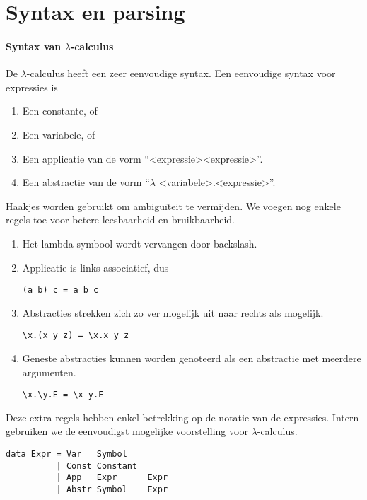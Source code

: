 \documentclass[a4paper,10pt]{article}
\begin{document}
\section{Syntax en parsing}
\paragraph {Syntax van $\lambda$-calculus}
De $\lambda$-calculus heeft een zeer eenvoudige syntax.
Een eenvoudige syntax voor expressies is
\begin{enumerate}
\item Een constante, of
\item Een variabele, of
\item Een applicatie van de vorm ``\textless expressie\textgreater \textless expressie\textgreater''.
\item Een abstractie van de vorm ``$\lambda$ \textless variabele\textgreater .\textless expressie\textgreater''.
\end{enumerate}
Haakjes worden gebruikt om ambigu{\"i}teit te vermijden.
We voegen nog enkele regels toe voor betere leesbaarheid en bruikbaarheid.
\begin{enumerate}
\item Het lambda symbool wordt vervangen door backslash.
\item Applicatie is links-associatief, dus
\begin{verbatim}
(a b) c = a b c
\end{verbatim}
\item Abstracties strekken zich zo ver mogelijk uit naar rechts als mogelijk.
\begin{verbatim}
\x.(x y z) = \x.x y z
\end{verbatim}
\item Geneste abstracties kunnen worden genoteerd als een abstractie met meerdere argumenten.
\begin{verbatim}
\x.\y.E = \x y.E
\end{verbatim}
\end{enumerate}
Deze extra regels hebben enkel betrekking op de notatie van de expressies.
Intern gebruiken we de eenvoudigst mogelijke voorstelling voor $\lambda$-calculus.
\begin{lstlisting}
data Expr = Var   Symbol
          | Const Constant
          | App   Expr      Expr
          | Abstr Symbol    Expr
\end{lstlisting}
\end{document}
